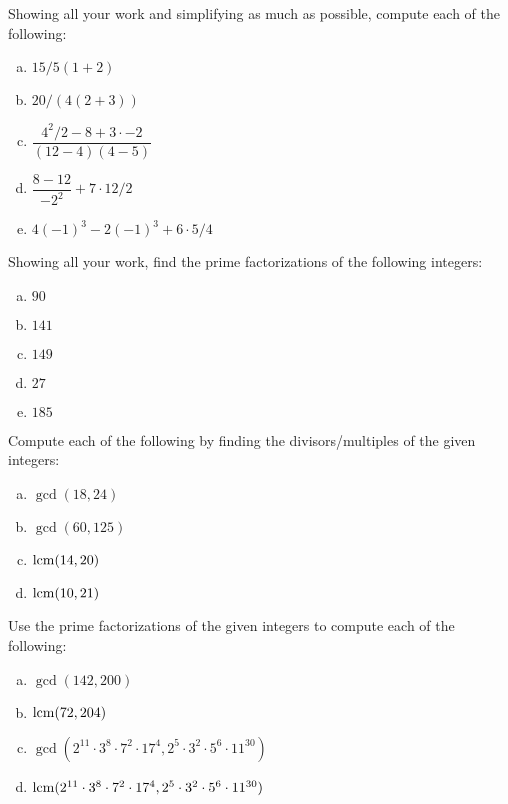 \documentclass[11pt,letterpaper]{article}
\begin{document}

 Showing all your work and simplifying as much as possible, compute each of the following:
        \begin{enumerate}[(a)]
        \item $15/5(1 + 2)$
        \item $20/(4(2 + 3))$
        \item $\dfrac{4^2/2 - 8 + 3 \cdot -2}{(12 - 4)(4 - 5)}$
        \item $\dfrac{8 - 12}{-2^2} + 7 \cdot 12/2$
        \item $4(-1)^3 - 2(-1)^3 + 6 \cdot 5/4$
        \end{enumerate}



\newpage



 Showing all your work, find the prime factorizations of the following integers:
        \begin{enumerate}[(a)]
        \item $90$
        \item $141$
        \item $149$
        \item $27$
        \item $185$
        \end{enumerate}



\newpage



 Compute each of the following by finding the divisors/multiples of the given integers:
        \begin{enumerate}[(a)]
        \item $\gcd(18, 24)$
        \item $\gcd(60, 125)$
        \item $\operatorname{lcm}(14, 20)$
        \item $\operatorname{lcm}(10, 21)$
        \end{enumerate}



\newpage



 Use the prime factorizations of the given integers to compute each of the following:
        \begin{enumerate}[(a)]
        \item $\gcd(142, 200)$
        \item $\operatorname{lcm}(72, 204)$
        \item $\gcd(2^{11} \cdot 3^8 \cdot 7^2 \cdot 17^4, 2^5 \cdot 3^2 \cdot 5^6 \cdot 11^{30})$
        \item $\operatorname{lcm}(2^{11} \cdot 3^8 \cdot 7^2 \cdot 17^4, 2^5 \cdot 3^2 \cdot 5^6 \cdot 11^{30})$
        \end{enumerate}
\end{document}

